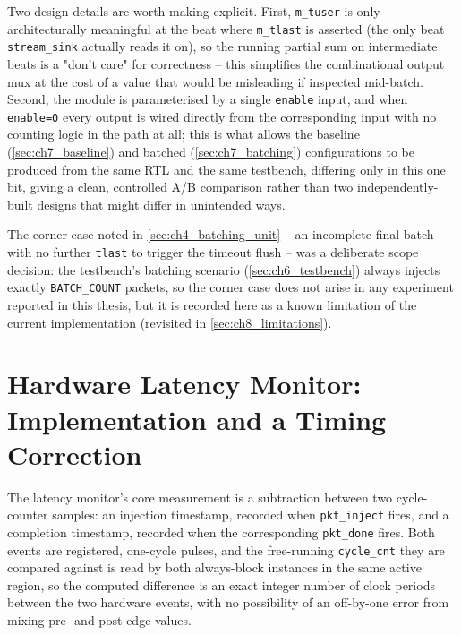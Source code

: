 Two design details are worth making explicit. First, \texttt{m\_tuser} is only architecturally meaningful at the beat where \texttt{m\_tlast} is asserted (the only beat \texttt{stream\_sink} actually reads it on), so the running partial sum on intermediate beats is a "don't care" for correctness -- this simplifies the combinational output mux at the cost of a value that would be misleading if inspected mid-batch. Second, the module is parameterised by a single \texttt{enable} input, and when \texttt{enable=0} every output is wired directly from the corresponding input with no counting logic in the path at all; this is what allows the baseline (\autoref{sec:ch7_baseline}) and batched (\autoref{sec:ch7_batching}) configurations to be produced from the same RTL and the same testbench, differing only in this one bit, giving a clean, controlled A/B comparison rather than two independently-built designs that might differ in unintended ways.

The corner case noted in \autoref{sec:ch4_batching_unit} -- an incomplete final batch with no further \texttt{tlast} to trigger the timeout flush -- was a deliberate scope decision: the testbench's batching scenario (\autoref{sec:ch6_testbench}) always injects exactly \texttt{BATCH\_COUNT} packets, so the corner case does not arise in any experiment reported in this thesis, but it is recorded here as a known limitation of the current implementation (revisited in \autoref{sec:ch8_limitations}).


\section{Hardware Latency Monitor: Implementation and a Timing Correction}
\label{sec:ch5_latmon_impl}

The latency monitor's core measurement is a subtraction between two cycle-counter samples: an injection timestamp, recorded when \texttt{pkt\_inject} fires, and a completion timestamp, recorded when the corresponding \texttt{pkt\_done} fires. Both events are registered, one-cycle pulses, and the free-running \texttt{cycle\_cnt} they are compared against is read by both always-block instances in the same active region, so the computed difference is an exact integer number of clock periods between the two hardware events, with no possibility of an off-by-one error from mixing pre- and post-edge values.

